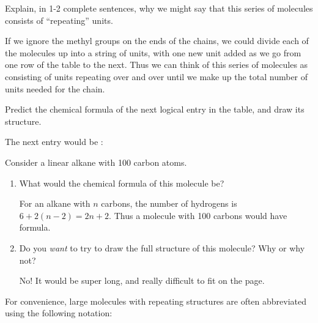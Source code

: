 \begin{activity}
\begin{ctqs}
	\question Explain, in 1-2 complete sentences, why we might say that this series of molecules consists of ``repeating''  units.
			
				\begin{solution}[1.5in]
					If we ignore the methyl groups on the ends of the chains, we could divide each of the molecules up into a string of  units, with one new unit added as we go from one row of the table to the next.  Thus we can think of this series of molecules as consisting of  units repeating over and over until we make up the total number of units needed for the chain.
				\end{solution}
				
		
	\question Predict the chemical formula of the next logical entry in the table, and draw its structure.
			
				\begin{solution}[1in]
					The next entry would be :
					
				\end{solution}
		
	\question Consider a linear alkane with 100 carbon atoms. \label{\labelbase:ctq:100Calkane}
		\begin{enumerate}
			
			\item What would the chemical formula of this molecule be?
			
				\begin{solution}[1in]
					For an alkane with $n$ carbons, the number of hydrogens is $6+2(n-2) = 2n+2$.  Thus a molecule with 100 carbons would have formula.
				\end{solution}
			
			\item Do you \emph{want} to try to draw the full structure of this molecule?  Why or why not?
			
				\begin{solution}[1.25in]
					No!  It would be super long, and really difficult to fit on the page.
				\end{solution}
		\end{enumerate}
\end{ctqs}

\begin{infobox}
	For convenience, large molecules with repeating structures are often abbreviated using the following notation:
	

\end{infobox}
\end{activity}
